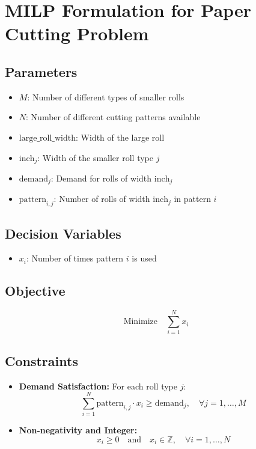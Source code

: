 \documentclass{article}
\begin{document}
\section*{MILP Formulation for Paper Cutting Problem}

\subsection*{Parameters}
\begin{itemize}
    \item \( M \): Number of different types of smaller rolls
    \item \( N \): Number of different cutting patterns available
    \item \( \text{large\_roll\_width} \): Width of the large roll
    \item \( \text{inch}_j \): Width of the smaller roll type \( j \)
    \item \( \text{demand}_j \): Demand for rolls of width \( \text{inch}_j \)
    \item \( \text{pattern}_{i,j} \): Number of rolls of width \( \text{inch}_j \) in pattern \( i \)
\end{itemize}

\subsection*{Decision Variables}
\begin{itemize}
    \item \( x_i \): Number of times pattern \( i \) is used
\end{itemize}

\subsection*{Objective}
\[
\text{Minimize} \quad \sum_{i=1}^{N} x_i
\]

\subsection*{Constraints}
\begin{itemize}
    \item \textbf{Demand Satisfaction:} For each roll type \( j \):
    \[
    \sum_{i=1}^{N} \text{pattern}_{i,j} \cdot x_i \geq \text{demand}_j, \quad \forall j = 1, \ldots, M
    \]
    \item \textbf{Non-negativity and Integer:}
    \[
    x_i \geq 0 \quad \text{and} \quad x_i \in \mathbb{Z}, \quad \forall i = 1, \ldots, N
    \]
\end{itemize}
\end{document}
